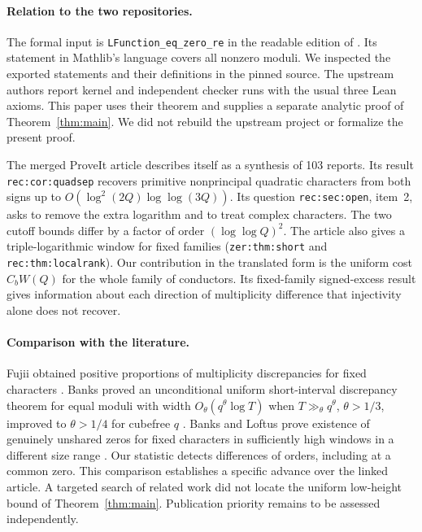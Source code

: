 \documentclass[11pt]{article}
\begin{document}
\paragraph{Relation to the two repositories.}
The formal input is \texttt{LFunction\_eq\_zero\_re} in the readable edition
of \cite{lean}. Its statement in Mathlib's language covers all nonzero moduli.
We inspected the exported statements and their definitions in the pinned source.
The upstream authors report kernel and independent checker runs with the usual
three Lean axioms. This paper uses their theorem and supplies a separate analytic
proof of Theorem~\ref{thm:main}. We did not rebuild the upstream project or formalize
the present proof.

The merged ProveIt article \cite{article} describes itself as a synthesis of 103 reports.
Its result \texttt{rec:cor:quadsep} recovers primitive nonprincipal quadratic
characters from both signs up to $O(\log^2(2Q)\log\log(3Q))$. Its question
\texttt{rec:sec:open}, item~2, asks to remove the extra logarithm and to treat complex
characters. The two cutoff bounds differ by a factor of order $(\log\log Q)^2$.
The article also gives a triple-logarithmic window for fixed families
(\texttt{zer:thm:short} and \texttt{rec:thm:localrank}). Our contribution in the
translated form is the uniform cost $C_b W(Q)$ for the whole family of conductors.
Its fixed-family signed-excess result gives information about each direction of
multiplicity difference that injectivity alone does not recover.

\paragraph{Comparison with the literature.}
Fujii obtained positive proportions of multiplicity discrepancies for fixed characters
\cite{fujii}. Banks proved an unconditional uniform short-interval discrepancy theorem
for equal moduli with width $O_\theta(q^\theta\log T)$ when $T\gg_\theta q^\theta$,
$\theta>1/3$, improved to $\theta>1/4$ for cubefree $q$ \cite{banks}. Banks and
Loftus prove existence of genuinely unshared zeros for fixed characters in sufficiently
high windows in a different size range \cite{loftus}. Our statistic detects
differences of orders, including at a common zero. This comparison establishes a
specific advance over the linked article. A targeted search of related work did
not locate the uniform low-height bound of Theorem~\ref{thm:main}. Publication
priority remains to be assessed independently.
\end{document}
